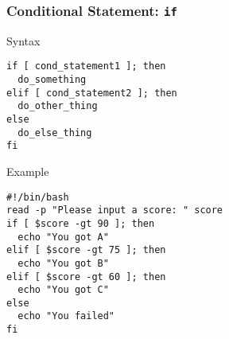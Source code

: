 \documentclass[red]{beamer}
\begin{document}
\begin{CJK*}{UTF8}{gbsn}
\begin{frame}
\frametitle{Conditional Statement: \texttt{if}}
\begin{block}{\centering Syntax}
\begin{lstlisting}
if [ cond_statement1 ]; then
  do_something
elif [ cond_statement2 ]; then
  do_other_thing
else
  do_else_thing
fi
\end{lstlisting}
\end{block}
\begin{block}{\centering Example}
\begin{lstlisting}[basicstyle=\tiny\ttfamily,indentation=true]
#!/bin/bash
read -p "Please input a score: " score
if [ $score -gt 90 ]; then
  echo "You got A"
elif [ $score -gt 75 ]; then
  echo "You got B"
elif [ $score -gt 60 ]; then
  echo "You got C"
else
  echo "You failed"
fi
\end{lstlisting}
\end{block}
\end{frame}



\end{CJK*}
\end{document}
